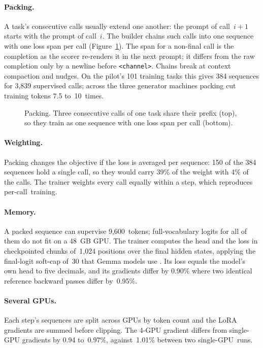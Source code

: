\paragraph{Packing.} A task's consecutive calls usually extend one another: the prompt of call~$i{+}1$ starts with the prompt of call~$i$. The builder chains such calls into one sequence with one loss span per call (Figure~\ref{fig:packing}). The span for a non-final call is the completion as the scorer re-renders it in the next prompt; it differs from the raw completion only by a newline before \texttt{\textless{}channel\textbar{}\textgreater{}}. Chains break at context compaction and nudges. On the pilot's 101 training tasks this gives 384 sequences for 3,839 supervised calls; across the three generator machines packing cut training tokens 7.5 to~10~times.

\begin{figure}[t]
\centering

\caption{Packing. Three consecutive calls of one task share their prefix (top), so they train as one sequence with one loss span per call (bottom).}\label{fig:packing}
\end{figure}

\paragraph{Weighting.} Packing changes the objective if the loss is averaged per sequence: 150 of the 384 sequences hold a single call, so they would carry 39\% of the weight with 4\% of the calls. The trainer weights every call equally within a step, which reproduces per-call~training.

\paragraph{Memory.} A packed sequence can supervise 9,600~tokens; full-vocabulary logits for all of them do not fit on a 48~GB GPU. The trainer computes the head and the loss in checkpointed chunks of~1,024 positions over the final hidden states, applying the final-logit soft-cap of~30 that Gemma models use \citep{gemma2}. Its loss equals the model's own head to five decimals, and its gradients differ by 0.90\% where two identical reference backward passes differ by~0.95\%.

\paragraph{Several GPUs.} Each step's sequences are split across GPUs by token count and the LoRA gradients are summed before clipping. The 4\nobreakdash-GPU gradient differs from single-GPU gradients by 0.94 to~0.97\%, against~1.01\% between two single-GPU~runs.


